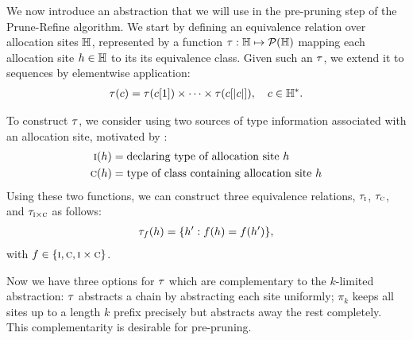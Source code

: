We now introduce an abstraction that we will use in the pre-pruning step of the Prune-Refine algorithm.
We start by defining an equivalence relation over allocation sites ${\mathbb H}$,
represented by a function $\tau : {\mathbb H} \mapsto \mathcal{P}({\mathbb H})$
mapping each allocation site $h \in {\mathbb H}$ to its its equivalence class.
Given such an $\tau$, we extend it to sequences by elementwise application:
\begin{align}
\tau(c) = \tau(c[1]) \times \cdots \times \tau(c[|c|]), \quad c \in {\mathbb H}^*.
\end{align}

To construct $\tau$, we consider using two sources of type information associated
with an allocation site, motivated by \cite{smaragdakis11context}:
\begin{align}
\text{\sc i}(h)  &= \text{declaring type of allocation site $h$} \label{eqn:typeIs} \\
\text{\sc c}(h) &= \text{type of class containing allocation site $h$} \label{eqn:typeHas}
\end{align}
Using these two functions, we can construct three equivalence relations,
$\tau_{\text{\sc i}}$, $\tau_{\text{\sc c}}$, and $\tau_{\text{\sc i} \times \text{\sc c}}$ as follows:
\begin{align}
\tau_f(h) = \{ h' : f(h) = f(h') \}, \label{eqn:hclass}
\end{align}
with $f \in \{ \text{\sc i}, \text{\sc c}, \text{\sc i} \times \text{\sc c} \}$.

Now we have three options for $\tau$ which are complementary to the
$k$-limited abstraction: $\tau$ abstracts a chain by abstracting each site
uniformly; $\pi_k$ keeps all sites up to a length $k$ prefix precisely but
abstracts away the rest completely.  This complementarity is desirable
for pre-pruning.

